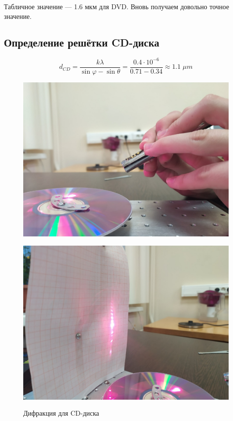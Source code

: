 \documentclass[titlepage, a4paper,12pt]{article}
\begin{document}
	Табличное значение --- 1.6 мкм для DVD. Вновь получаем довольно точное значение.
	
	\subsection{Определение решётки CD-диска}
	
	$$ d_{CD} = \frac{k \lambda}{\sin\varphi - \sin\theta} = \frac{ 0.4 \cdot 10^{-6}}{0.71 - 0.34} \approx 1.1 \; \mu m $$
	
	\begin{figure}[h!]
		\begin{center}
			\begin{minipage}[h]{0.49\linewidth}
				\includegraphics[width=1\linewidth]{5_1}
				\label{ris:5.1} %
			\end{minipage}
		\hfill
			\begin{minipage}[h]{0.49\linewidth}
				\includegraphics[width=1\linewidth]{5_2}
				\label{ris:5.2}
			\end{minipage}
			\caption{Дифракция для CD-диска}
		\end{center}
	\end{figure}
	
\end{document}
